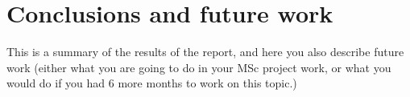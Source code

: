 \chapter{Conclusions and future work}\label{cha:conclusions}
%
This is a summary of the results of the report, and here you also describe future work (either what you are going to do in your MSc project work, or what you would do if you had 6 more months to work on this topic.)